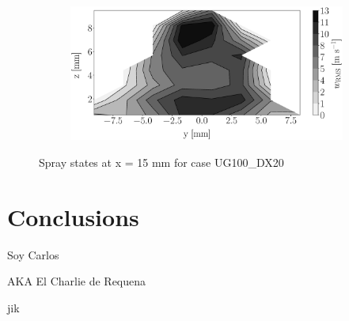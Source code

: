 \begin{figure}[h!]
\begin{subfigure}[b]{0.22\textwidth}
\end{subfigure}
   \hspace{0.17in}
\begin{subfigure}[b]{0.22\textwidth}
	\centering
   \includegraphics[scale=0.17]{./part2_developments/figures_ch5_resolved_JICF/injectors_SLI/uG100_dx20_x15_uz_rms_map.eps}
\end{subfigure}
\caption{Spray states at x = 15 mm for case UG100\_DX20}
\label{fig:injectors_sli_uG100_dx20_x15}
\end{figure}


\clearpage

\section{Conclusions}

Soy Carlos

AKA El Charlie de Requena

jik
